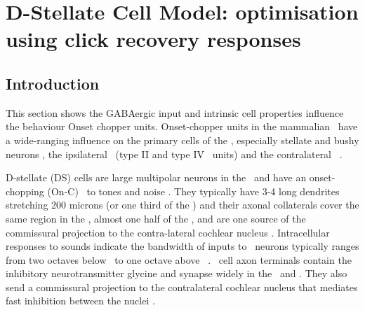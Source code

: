 
\section[DS Cell Model]{D-Stellate Cell Model: optimisation using click recovery
  responses}\label{sec:d-stellate-cell-model}

\subsection{Introduction}\label{sec:DS:introduction}

This section shows the GABAergic input and intrinsic cell properties
influence the behaviour Onset chopper units.  Onset-chopper units in
the mammalian \VCN~have a wide-ranging influence on the primary cells
of the \VCN, especially stellate and bushy neurons
\citep{RhodeSmithEtAl:1983}, the ipsilateral \DCN~(type II and type IV
\EIRA~units) and the contra\-lateral \CN~\citep{NeedhamPaolini:2007}.

\smallskip{}

  
D-stellate (DS) cells are large multipolar neurons in the \VCN~and have an
onset-chopping (On-C) \PSTH~to tones and noise \citep{SmithRhode:1989,
  NeedhamPaolini:2006}.  They typically have 3-4 long dendrites stretching 200
microns (or one third of the \VCN) and their axonal collaterals cover the same
region in the \VCN, almost one half of the \DCN, and are one source of the
commissural projection to the contra-lateral cochlear nucleus
\citep{Cant:1992,Cant:1981,SchofieldCant:1996,CantBenson:2003,
  NeedhamPaolini:2007, PaoliniClark:1999}. Intracellular responses to sounds
indicate the bandwidth of inputs to \DS~neurons typically ranges from two
octaves below \CF~to one octave above \CF~\citep{PalmerJiangEtAl:1996,
  JiangPalmerEtAl:1996, PaoliniClark:1999}. \DS~cell axon terminals contain the
inhibitory neurotransmitter glycine and synapse widely in the \VCN~and \DCN\@.
They also send a commissural projection to the contralateral cochlear nucleus
that mediates fast inhibition between the nuclei \citep{NeedhamPaolini:2003,
  NeedhamPaolini:2006, Oertel:1997}.

